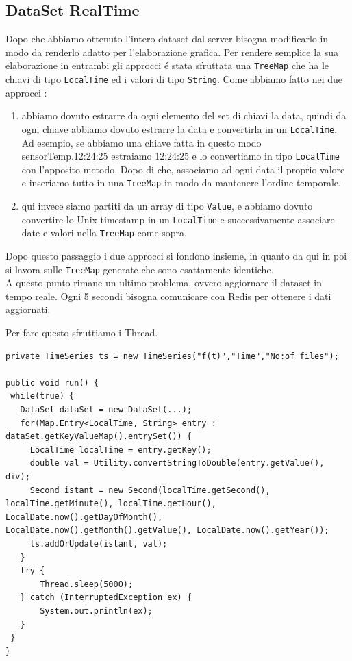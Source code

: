 \subsection{DataSet RealTime}
Dopo che abbiamo ottenuto l'intero dataset dal server bisogna modificarlo in modo da renderlo adatto per l'elaborazione grafica.
Per rendere semplice la sua elaborazione in entrambi gli approcci é stata sfruttata una \texttt{TreeMap} che ha le chiavi
di tipo \texttt{LocalTime} ed i valori di tipo \texttt{String}.
Come abbiamo fatto nei due approcci :
\begin{enumerate}
    \item abbiamo dovuto estrarre da ogni elemento del set di chiavi la data, quindi da ogni chiave abbiamo dovuto estrarre la data e convertirla
    in un \texttt{LocalTime}.
    Ad esempio, se abbiamo una chiave fatta in questo modo sensorTemp.12:24:25 estraiamo 12:24:25 e lo convertiamo in tipo \texttt{LocalTime} con l'apposito metodo.
    Dopo di che, associamo ad ogni data il proprio valore e inseriamo tutto in una \texttt{TreeMap} in modo da mantenere l'ordine temporale.
    \item qui invece siamo partiti da un array di tipo \texttt{Value}, e abbiamo dovuto convertire lo Unix timestamp in un \texttt{LocalTime} e successivamente associare date
    e valori nella \texttt{TreeMap} come sopra.
\end{enumerate}
Dopo questo passaggio i due approcci si fondono insieme, in quanto da qui in poi si lavora sulle \texttt{TreeMap} generate che sono esattamente identiche.\\

A questo punto rimane un ultimo problema, ovvero aggiornare il dataset in tempo reale.
Ogni 5 secondi bisogna comunicare con Redis per ottenere i dati aggiornati.

Per fare questo sfruttiamo i Thread.


\begin{lstlisting}[autogobble, title={\texttt{DataSetRealTime.java}}]
private TimeSeries ts = new TimeSeries("f(t)","Time","No:of files");

public void run() {
 while(true) {
   DataSet dataSet = new DataSet(...);
   for(Map.Entry<LocalTime, String> entry : dataSet.getKeyValueMap().entrySet()) {
     LocalTime localTime = entry.getKey();
     double val = Utility.convertStringToDouble(entry.getValue(), div);
     Second istant = new Second(localTime.getSecond(), localTime.getMinute(), localTime.getHour(), LocalDate.now().getDayOfMonth(), LocalDate.now().getMonth().getValue(), LocalDate.now().getYear());
     ts.addOrUpdate(istant, val);
   }
   try {
       Thread.sleep(5000);
   } catch (InterruptedException ex) {
       System.out.println(ex);
   }
 }
}
\end{lstlisting}

